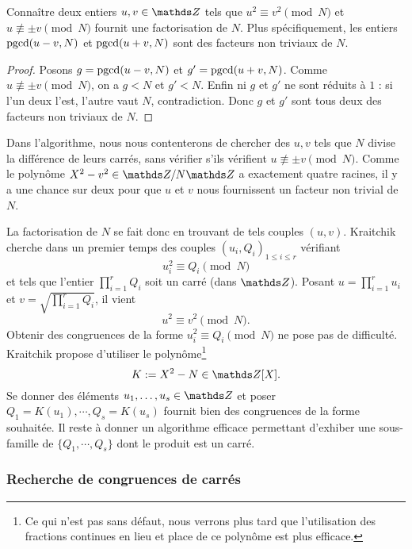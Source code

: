 \begin{lemme}
	Connaître deux entiers $u, v \in \Z$ tels que $u^2 \equiv v^2 
	\pmod{N}$ et $u\not\equiv \pm v\pmod{N}$ fournit une factorisation de $N$.
	Plus spécifiquement, les entiers $\operatorname{pgcd}(u-v, N)$ et $\operatorname{pgcd}(u+v, N)$ sont
	des facteurs non triviaux de $N$.
\end{lemme}

\begin{proof}
	Posons $g =\operatorname{pgcd}(u-v, N)$ et $g' = \operatorname{pgcd}(u+v, N)$. Comme $u\not\equiv \pm
	v\pmod{N}$, on a $g<N$ et $g'<N$. Enfin ni $g$ et $g'$ ne sont réduits à
	$1$ : si l'un deux l'est, l'autre vaut $N$, contradiction. Donc $g$ et $g'$
	sont tous deux des facteurs non triviaux de $N$.
\end{proof}

\begin{remarque}
	Dans l'algorithme, nous nous contenterons de chercher des $u, v$ tels que
	$N$ divise la différence de leurs carrés, sans vérifier s'ils vérifient $u
	\not\equiv \pm v\pmod{N}$. Comme le polynôme $X^2 - v^2 \in \Z/N\Z$ a
    exactement quatre racines, il y a \og{} une chance sur deux \fg{}  pour que
	$u$ et $v$ nous fournissent un facteur non trivial de $N$.
\end{remarque}

La factorisation de $N$ se fait donc en trouvant de tels couples $(u, v)$.
Kraitchik cherche dans un premier temps des couples $(u_i, Q_i)_{1\leq i \leq
r}$ vérifiant \[u_i^2 \equiv Q_i \pmod{N}\] et tels que l'entier $\prod_{i=1}^r
Q_i$ soit un carré (dans $\Z$). Posant $u = \prod_{i=1}^r u_i$ et $v =
\sqrt{\prod_{i=1}^rQ_i}$, il vient \[u^2\equiv v^2 \pmod{N}.\] Obtenir des
congruences de la forme $u_i^2 \equiv Q_i \pmod{N}$ ne pose pas de difficulté.
Kraitchik propose d'utiliser le polynôme\footnote{Ce qui n'est pas sans défaut,
nous verrons plus tard que l'utilisation des fractions continues en lieu et
place de ce polynôme est plus efficace.} \[K:= X^2 - N \in \Z[X].\] Se donner
des éléments $u_1,\dots, u_s\in \Z$ et poser $Q_1 = K(u_1), \cdots, Q_s =
K(u_s)$ fournit bien des congruences de la forme souhaitée. Il reste à donner
un algorithme efficace permettant d'exhiber une sous-famille de $\{Q_1, \cdots,
Q_s\}$ dont le produit est un carré.

\subsubsection{Recherche de congruences de carrés}

